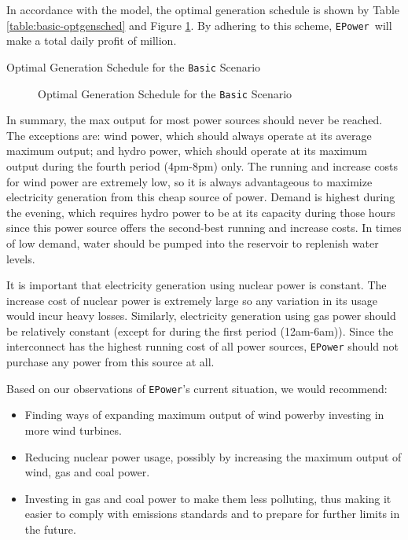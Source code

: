 \documentclass{article}
\newcommand{\EPower}{\texttt{EPower}}
\begin{document}
    In accordance with the model, the optimal generation schedule is shown by Table \ref{table:basic-optgensched} and Figure \ref{fig:basic-optgensched}.  By adhering to this scheme, \EPower\ will make a total daily profit of  million.
    
    \begin{table}[h!]\label{table:basic-optgensched}
    	\centering
    	\caption{Optimal Generation Schedule for the \texttt{Basic} Scenario}
    \end{table}
    
    \begin{figure}[h!]
        \centering
        \caption{Optimal Generation Schedule for the \texttt{Basic} Scenario}
        \label{fig:basic-optgensched}
    \end{figure}
    
    In summary, the max output for most power sources should never be reached. The exceptions are: wind power, which should always operate at its average maximum output; and hydro power, which should operate at its maximum output during the fourth period (4pm-8pm) only. The running and increase costs for wind power are extremely low, so it is always advantageous to maximize electricity generation from this cheap source of power. Demand is highest during the evening, which requires hydro power to be at its capacity during those hours since this power source offers the second-best running and increase costs. In times of low demand, water should be pumped into the reservoir to replenish water levels.
    
    It is important that electricity generation using nuclear power is constant. The increase cost of nuclear power is extremely large so any variation in its usage would incur heavy losses. Similarly, electricity generation using gas power should be relatively constant (except for during the first period (12am-6am)). Since the interconnect has the highest running cost of all power sources, \texttt{EPower} should not purchase any power from this source at all.
    
    Based on our observations of \texttt{EPower}'s current situation, we would recommend:
    \begin{itemize}
    \item Finding ways of expanding maximum output of wind power\textemdash by investing in more wind turbines.
    \item Reducing nuclear power usage, possibly by increasing the maximum output of wind, gas and coal power.
    \item Investing in gas and coal power to make them less polluting, thus making it easier to comply with emissions standards and to prepare for further limits in the future.
    \end{itemize}
    
\end{document}
